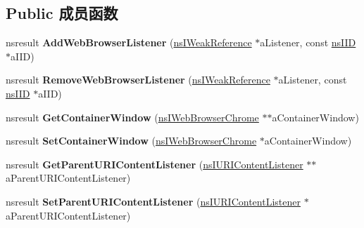\subsection*{Public 成员函数}
\begin{DoxyCompactItemize}
\item 
\mbox{\label{interfacens_i_web_browser_adbed571c0956a7389718a6e8f093d182}} 
nsresult {\bfseries Add\+Web\+Browser\+Listener} (\hyperlink{interfacens_i_weak_reference}{ns\+I\+Weak\+Reference} $\ast$a\+Listener, const \hyperlink{struct___i_i_d}{ns\+I\+ID} $\ast$a\+I\+ID)
\item 
\mbox{\label{interfacens_i_web_browser_a8a66ea2e9c9a4fdba0d1bdc90f8a3526}} 
nsresult {\bfseries Remove\+Web\+Browser\+Listener} (\hyperlink{interfacens_i_weak_reference}{ns\+I\+Weak\+Reference} $\ast$a\+Listener, const \hyperlink{struct___i_i_d}{ns\+I\+ID} $\ast$a\+I\+ID)
\item 
\mbox{\label{interfacens_i_web_browser_a679f84bdd62fdbe13033c2be2759ec29}} 
nsresult {\bfseries Get\+Container\+Window} (\hyperlink{interfacens_i_web_browser_chrome}{ns\+I\+Web\+Browser\+Chrome} $\ast$$\ast$a\+Container\+Window)
\item 
\mbox{\label{interfacens_i_web_browser_a6fce7dcf0a732e08c1b87f682213a48a}} 
nsresult {\bfseries Set\+Container\+Window} (\hyperlink{interfacens_i_web_browser_chrome}{ns\+I\+Web\+Browser\+Chrome} $\ast$a\+Container\+Window)
\item 
\mbox{\label{interfacens_i_web_browser_a6264aa0835aa3091eb90960ea81077b5}} 
nsresult {\bfseries Get\+Parent\+U\+R\+I\+Content\+Listener} (\hyperlink{interfacens_i_u_r_i_content_listener}{ns\+I\+U\+R\+I\+Content\+Listener} $\ast$$\ast$a\+Parent\+U\+R\+I\+Content\+Listener)
\item 
\mbox{\label{interfacens_i_web_browser_ac3d42afbc84d8ef78bc8728ad6fed2cf}} 
nsresult {\bfseries Set\+Parent\+U\+R\+I\+Content\+Listener} (\hyperlink{interfacens_i_u_r_i_content_listener}{ns\+I\+U\+R\+I\+Content\+Listener} $\ast$a\+Parent\+U\+R\+I\+Content\+Listener)
\item 
\mbox{\label{interfacens_i_web_browser_aa5d7e7731133d8e53653cce8690c4832}} 

\end{DoxyCompactItemize}

